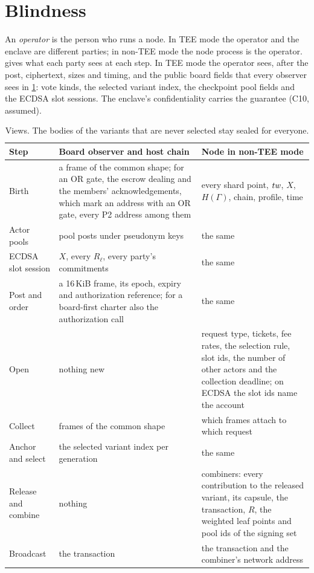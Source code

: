 \section{Blindness}\label{sec:blindness}

An \emph{operator} is the person who runs a node. In TEE mode the operator and the enclave are different parties; in non-TEE mode the node process is the operator.  gives what each party sees at each step. In TEE mode the operator sees, after the post, ciphertext, sizes and timing, and the public board fields that every observer sees in \cref{tab:views}: vote kinds, the selected variant index, the checkpoint pool fields and the ECDSA slot sessions. The enclave's confidentiality carries the guarantee (C10, assumed).

\begin{table}[t]
\centering
\small
\begin{tabularx}{\linewidth}{@{}l>{\raggedright\arraybackslash}X>{\raggedright\arraybackslash}X@{}}
\toprule
Step & Board observer and host chain & Node in non-TEE mode \\
\midrule
Birth & a frame of the common shape; for an OR gate, the escrow dealing and the members' acknowledgements, which mark an address with an OR gate, every P2 address among them & every shard point, $\mathit{tw}$, $X$, $H(\Gamma)$, chain, profile, time \\
Actor pools & pool posts under pseudonym keys & the same \\
ECDSA slot session & $X$, every $R_\ell$, every party's commitments & the same \\
Post and order & a 16\,KiB frame, its epoch, expiry and authorization reference; for a board-first charter also the authorization call & the same \\
Open & nothing new & request type, tickets, fee rates, the selection rule, slot ids, the number of other actors and the collection deadline; on ECDSA the slot ids name the account \\
Collect & frames of the common shape & which frames attach to which request \\
Anchor and select & the selected variant index per generation & the same \\
Release and combine & nothing & combiners: every contribution to the released variant, its capsule, the transaction, $R$, the weighted leaf points and pool ids of the signing set \\
Broadcast & the transaction & the transaction and the combiner's network address \\
\bottomrule
\end{tabularx}
\caption{Views. The bodies of the variants that are never selected stay sealed for everyone.}
\label{tab:views}
\end{table}

